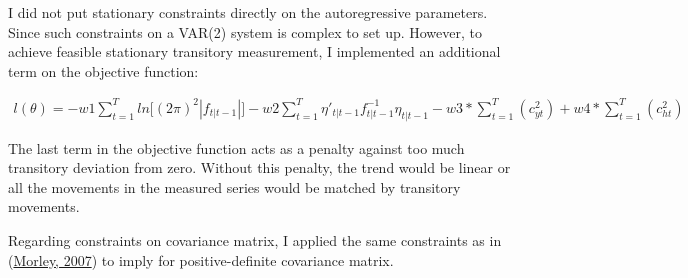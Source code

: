 \documentclass[
  12pt,
]{article}
\begin{document}
I did not put stationary constraints directly on the autoregressive parameters. Since such constraints on a VAR(2) system is complex to set up. However, to achieve feasible stationary transitory measurement, I implemented an additional term on the objective function:

\begin{align}
l(\theta) = -w1\sum_{t=1}^{T}ln\lbrack(2\pi)^2|f_{t|t-1}|\rbrack
-w2\sum_{t=1}^{T}\eta'_{t|t-1}f^{-1}_{t|t-1}\eta_{t|t-1}
- w3*\sum_{t=1}^{T}(c_{yt}^2) + w4*\sum_{t=1}^{T}(c_{ht}^2)
\end{align}

The last term in the objective function acts as a penalty against too much transitory deviation from zero. Without this penalty, the trend would be linear or all the movements in the measured series would be matched by transitory movements.

Regarding constraints on covariance matrix, I applied the same constraints as in (\protect\hyperlink{ref-morley_slow_2007}{Morley, 2007}) to imply for positive-definite covariance matrix.
\end{document}
